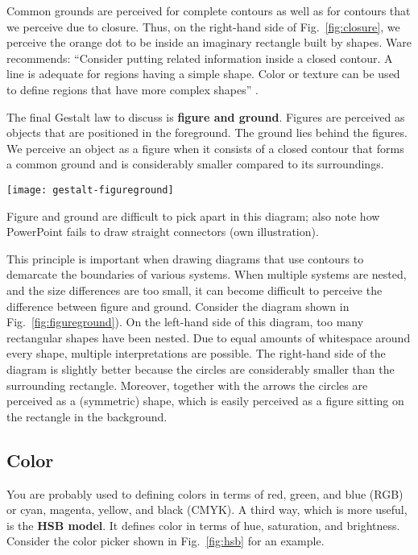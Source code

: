 Common grounds are perceived for complete contours as well as for contours that we perceive due to closure. Thus, on the right-hand side of Fig.~\ref{fig:closure}, we perceive the orange dot to be inside an imaginary rectangle built by shapes. Ware recommends: ``Consider putting related information inside a closed contour. A line is adequate for regions having a simple shape. Color or texture can be used to define regions that have more complex shapes'' \cite{Ware12}.

The final Gestalt law to discuss is \textbf{figure and ground}. Figures are perceived as objects that are positioned in the foreground. The ground lies behind the figures. We perceive an object as a figure when it consists of a closed contour that forms a common ground and is considerably smaller compared to its surroundings.

\begin{marginfigure}
\centering
\texttt{[image: gestalt-figureground]}
\caption{\label{fig:figureground} Figure and ground are difficult to pick apart in this diagram; also note how PowerPoint fails to draw straight connectors (own illustration).}%
\end{marginfigure}

This principle is important when drawing diagrams that use contours to demarcate the boundaries of various systems. When multiple systems are nested, and the size differences are too small, it can become difficult to perceive the difference between figure and ground. Consider the diagram shown in Fig.~\ref{fig:figureground}). On the left-hand side of this diagram, too many rectangular shapes have been nested. Due to equal amounts of whitespace around every shape, multiple interpretations are possible. The right-hand side of the diagram is slightly better because the circles are considerably smaller than the surrounding rectangle. Moreover, together with the arrows the circles are perceived as a (symmetric) shape, which is easily perceived as a figure sitting on the rectangle in the background.




\subsection{Color}
\label{sec:color}

You are probably used to defining colors in terms of red, green, and blue (RGB) or cyan, magenta, yellow, and black (CMYK). A third way, which is more useful, is the \textbf{HSB model}. It defines color in terms of hue, saturation, and brightness. Consider the color picker shown in Fig.~\ref{fig:hsb} for an example.

